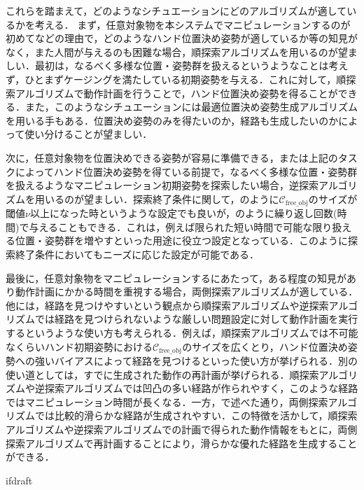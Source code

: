 \documentclass[a4paper,twoside,12pt,papersize, dvipdfmx]{iirthesis}
\begin{document}
これらを踏まえて，どのようなシチュエーションにどのアルゴリズムが適しているかを考える．
まず，任意対象物を本システムでマニピュレーションするのが初めてなどの理由で，どのようなハンド位置決め姿勢が適しているか等の知見がなく，また人間が与えるのも困難な場合，順探索アルゴリズムを用いるのが望ましい．最初は，なるべく多様な位置・姿勢群を扱えるというようなことは考えず，ひとまずケージングを満たしている初期姿勢を与える．これに対して，順探索アルゴリズムで動作計画を行うことで，ハンド位置決め姿勢を得ることができる．また，このようなシチュエーションには最適位置決め姿勢生成アルゴリズムを用いる手もある．位置決め姿勢のみを得たいのか，経路も生成したいのかによって使い分けることが望ましい．\par
次に，任意対象物を位置決めできる姿勢が容易に準備できる，または上記のタスクによってハンド位置決め姿勢を得ている前提で，なるべく多様な位置・姿勢群を扱えるようなマニピュレーション初期姿勢を探索したい場合，逆探索アルゴリズムを用いるのが望ましい．探索終了条件に関して，のように$\mathcal{C}_{\mathrm{free\_obj}}$のサイズが閾値$\nu$以上になった時というような設定でも良いが，のように繰り返し回数(時間)で与えることもできる．これは，例えば限られた短い時間で可能な限り扱える位置・姿勢群を増やすといった用途に役立つ設定となっている．このように探索終了条件においてもニーズに応じた設定が可能である．\par
最後に，任意対象物をマニピュレーションするにあたって，ある程度の知見があり動作計画にかかる時間を重視する場合，両側探索アルゴリズムが適している．他には，経路を見つけやすいという観点から順探索アルゴリズムや逆探索アルゴリズムでは経路を見つけられないような厳しい問題設定に対して動作計画を実行するというような使い方も考えられる．例えば，順探索アルゴリズムでは不可能なくらいハンド初期姿勢における$\mathcal{C}_{\mathrm{free\_obj}}$のサイズを広くとり，ハンド位置決め姿勢への強いバイアスによって経路を見つけるといった使い方が挙げられる．別の使い道としては，すでに生成された動作の再計画が挙げられる．順探索アルゴリズムや逆探索アルゴリズムでは凹凸の多い経路が作られやすく，このような経路ではマニピュレーション時間が長くなる．一方，で述べた通り，両側探索アルゴリズムでは比較的滑らかな経路が生成されやすい．この特徴を活かして，順探索アルゴリズムや逆探索アルゴリズムでの計画で得られた動作情報をもとに，両側探索アルゴリズムで再計画することにより，滑らかな優れた経路を生成することができる．



\expandafter\ifx\csname ifdraft\endcsname\relax
    
\end{document}
